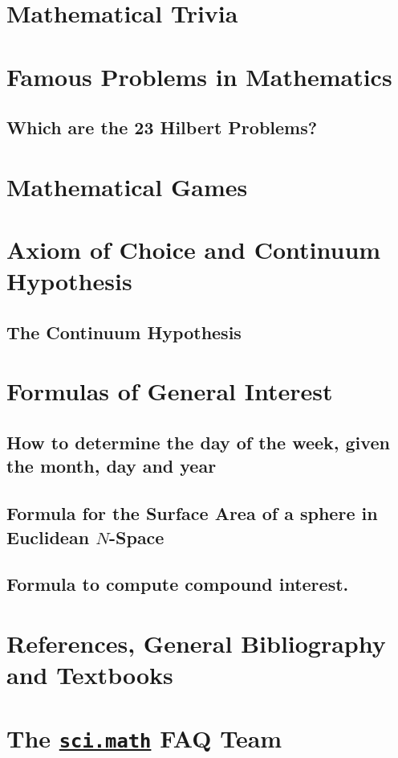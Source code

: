 \documentclass[a4paper]{report}
\begin{document}
\chapter{Mathematical Trivia}
  
\chapter{Famous Problems in Mathematics}
  
  
  \section{Which are the 23 Hilbert Problems?}
    
  
\chapter{Mathematical Games}
  
\chapter{Axiom of Choice and Continuum Hypothesis}
  
  
  \section{The Continuum Hypothesis}
    
\chapter{Formulas of General Interest}
  \section{How to determine the day of the week, given the month,
             day and year}
    
   
  \section{Formula for the Surface Area of a sphere in Euclidean $N$-Space}
    
  \section{Formula to compute compound interest.}
    
\chapter{References, General Bibliography and Textbooks}
  
\chapter{The \href{news://sci.math}{\texttt{sci.math}} FAQ Team}
  

\nocite{*}


\end{document}
